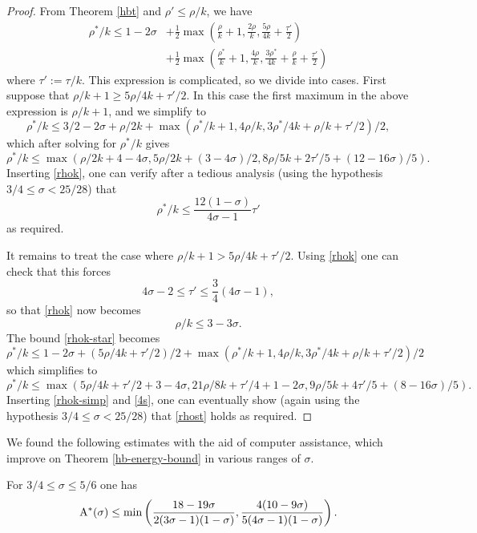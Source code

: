 \begin{proof}
From Theorem \ref{hbt} and $\rho' \le \rho/k$, we have
\begin{equation}\label{rhok-star}
\begin{split}
\rho^*/k \leq 1-2\sigma &+ \frac{1}{2}\max\left(\frac{\rho}{k}+1, \frac{2\rho}{k}, \frac{5\rho}{4k} + \frac{\tau'}{2}\right)\\
&+ \frac{1}{2}\max\left(\frac{\rho^*}{k}+1, \frac{4\rho}{k}, \frac{3\rho^*}{4k}+\frac{\rho}{k}+\frac{\tau'}{2}\right)
\end{split}
\end{equation}
where $\tau' := \tau/k$.  This expression is complicated, so we divide into cases.
First suppose that $\rho/k+1 \geq 5\rho/4k + \tau'/2$.  In this case the first maximum in the above expression is $\rho/k+1$, and we simplify to
$$ \rho^*/k \leq 3/2-2\sigma + \rho/2k + \max(\rho^*/k+1, 4\rho/k, 3\rho^*/4k+\rho/k+\tau'/2)/2,$$
which after solving for $\rho^*/k$ gives
$$ \rho^*/k \leq \max( \rho/2k + 4-4\sigma, 5\rho/2k + (3-4\sigma)/2, 8\rho/5k + 2\tau'/5 + (12-16\sigma)/5).$$
Inserting \eqref{rhok}, one can verify after a tedious analysis (using the hypothesis $3/4 \leq \sigma < 25/28$) that
\begin{equation}\label{rhost}
    \rho^*/k \leq \frac{12(1-\sigma)}{4\sigma-1} \tau'
\end{equation}
as required.

It remains to treat the case where $\rho/k+1 > 5\rho/4k + \tau'/2$.  Using \eqref{rhok} one can check that this forces
\begin{equation}\label{4s}
    4\sigma-2 \leq \tau' \leq \frac{3}{4}(4\sigma-1),
\end{equation}
so that \eqref{rhok} now becomes
\begin{equation}\label{rhok-simp}
\rho/k \leq 3-3\sigma.
\end{equation}
The bound \eqref{rhok-star} becomes
$$\rho^*/k \leq 1-2\sigma + (5\rho/4k+\tau'/2)/2 + \max(\rho^*/k+1, 4\rho/k, 3\rho^*/4k+\rho/k+\tau'/2)/2$$
which simplifies to
$$ \rho^*/k \leq \max( 5\rho/4k + \tau'/2 + 3-4\sigma, 21\rho/8k + \tau'/4 + 1-2\sigma, 9\rho/5k + 4\tau'/5 + (8 - 16\sigma)/5).$$
Inserting \eqref{rhok-simp} and \eqref{4s}, one can eventually show (again using the hypothesis $3/4 \leq \sigma < 25/28$) that
\eqref{rhost} holds as required.
\end{proof}

We found the following estimates with the aid of computer assistance, which improve on Theorem \ref{hb-energy-bound} in various ranges of $\sigma$. 
\begin{theorem}\label{imp-hb-energy-bound}
For $3/4 \le \sigma \le 5/6$ one has 
\[
\mathrm{A}^*(\sigma) \le \min\left(\frac{18 - 19\sigma}{2(3\sigma - 1)(1-\sigma)}, \frac{4(10 - 9\sigma)}{5(4\sigma - 1)(1 - \sigma)}\right).
\]
\end{theorem}

